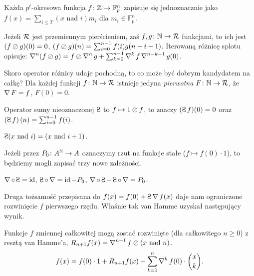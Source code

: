 \begin{fakt}
	Każda $p^t$-okresowa funkcja $f \colon \mathbb Z \to \mathbb F_p^n$ zapisuje się jednoznacznie jako $f(x) = \sum_{i \le T} (x \mbox{ nad }i) m_i$ dla $m_i \in \mathbb F_p^n$.
\end{fakt}

Jeżeli $\mathcal R$ jest przemiennym pierścieniem, zaś $f, g \colon \mathbb N \to \mathcal R$ funkcjami, to ich  jest $(f \oslash g)(0) = 0$, $(f \oslash g) (n) = \sum_{i=0}^{n-1} f(i) g(n-i-1)$.
Iterowaną różnicę splotu opisuje: $\operatorname{\nabla}^n (f \oslash g) = f \oslash \operatorname{\nabla}^n g + \sum_{k=0}^{n-1} \operatorname{\nabla}^k f \operatorname{\nabla}^{n-k-1} g (0)$.

Skoro operator różnicy udaje pochodną, to co może być dobrym kandydatem na całkę?
Dla każdej funkcji $f \colon \mathbb N \to \mathcal R$ istnieje jedyna \emph{pierwotna} $F \colon \mathbb N \to \mathcal R$, że $\operatorname{\nabla} F = f$, $F(0) = 0$.

\begin{definicja}
	Operator sumy nieoznaczonej $\suma$ to $f \mapsto 1 \oslash f$, to znaczy $(\suma f)(0) = 0$ oraz $\left(\suma f \right)(n) = \sum_{i=0}^{n-1} f(i)$.
\end{definicja}

\begin{przyklad}
	$\suma (x \mbox{ nad } i) = (x \mbox{ nad } i+1)$.
\end{przyklad}

Jeżeli przez $P_0 \colon A^\mathbb N \to A$ oznaczymy rzut na funkcje stałe ($f \mapsto f(0) \cdot 1$), to będziemy mogli zapisać trzy nowe zależności.

\begin{fakt}
	$\findif \circ \suma = \operatorname{id}$, 
	$\suma \circ \findif = \operatorname{id} - P_0$, 
	$\findif \circ \suma - \suma \circ \findif = P_0$.
\end{fakt}

Druga tożsamość przepisana do $f(x) = f(0) + \suma \findif f(x)$ daje nam ograniczone rozwinięcie $f$ pierwszego rzędu. 
Właśnie tak van Hamme uzyskał następujący wynik.

\begin{twierdzenie}
	Funkcje $f$ zmiennej całkowitej mogą zostać rozwinięte (dla całkowitego $n \ge 0$) z resztą van Hamme'a, $R_{n+1} f(x) = \operatorname{\nabla}^{n+1} f \oslash (x \mbox{ nad } n)$.
	\[
		f(x) = f(0) \cdot 1 + R_{n+1} f(x) + \sum_{k=1}^n \operatorname{\nabla}^k f(0) \cdot {x \choose k}.	
	\]
\end{twierdzenie}